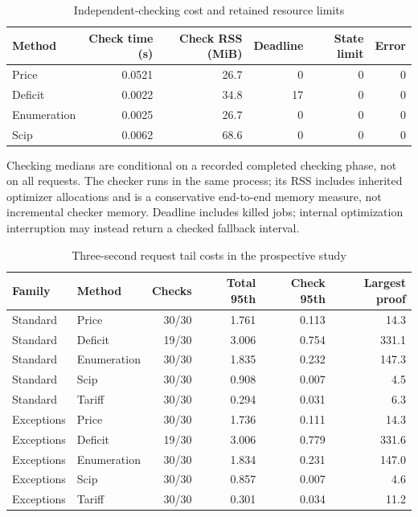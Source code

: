 \documentclass[11pt,letterpaper]{article}
\theoremstyle{definition}\newtheorem{remark}[theorem]{Remark}
\begin{document}
\begin{table}[p]\centering\caption{Independent-checking cost and retained resource limits}\label{tab:checking59}
\begin{tabular}{lrrrrr}\toprule
Method & Check time (s) & Check RSS (MiB) & Deadline & State limit & Error\\\midrule
Price & 0.0521 & 26.7 & 0 & 0 & 0\\
Deficit & 0.0022 & 34.8 & 17 & 0 & 0\\
Enumeration & 0.0025 & 26.7 & 0 & 0 & 0\\
Scip & 0.0062 & 68.6 & 0 & 0 & 0\\
\bottomrule\end{tabular}\par\smallskip\begin{minipage}{\textwidth}\small Checking medians are conditional on a recorded completed checking phase, not on all requests. The checker runs in the same process; its RSS includes inherited optimizer allocations and is a conservative end-to-end memory measure, not incremental checker memory. Deadline includes killed jobs; internal optimization interruption may instead return a checked fallback interval.\end{minipage}\end{table}\begin{table}[p]\centering\caption{Three-second request tail costs in the prospective study}\label{tab:tails60}
\begin{tabular}{llrrrr}\toprule Family & Method & Checks & Total 95th & Check 95th & Largest proof\\\midrule
Standard & Price & 30/30 & 1.761 & 0.113 & 14.3\\
Standard & Deficit & 19/30 & 3.006 & 0.754 & 331.1\\
Standard & Enumeration & 30/30 & 1.835 & 0.232 & 147.3\\
Standard & Scip & 30/30 & 0.908 & 0.007 & 4.5\\
Standard & Tariff & 30/30 & 0.294 & 0.031 & 6.3\\
Exceptions & Price & 30/30 & 1.736 & 0.111 & 14.3\\
Exceptions & Deficit & 19/30 & 3.006 & 0.779 & 331.6\\
Exceptions & Enumeration & 30/30 & 1.834 & 0.231 & 147.0\\
Exceptions & Scip & 30/30 & 0.857 & 0.007 & 4.6\\
Exceptions & Tariff & 30/30 & 0.301 & 0.034 & 11.2\\

\end{tabular}
\end{table}
\end{document}
